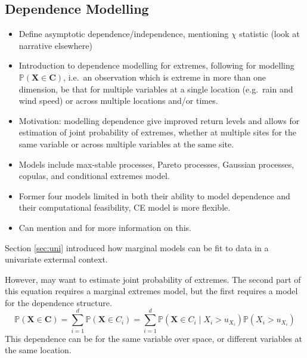 \documentclass{article}
\numberwithin{equation}{section}
\begin{document}
\subsection{Dependence Modelling}
\begin{itemize}
  \item Define asymptotic dependence/independence, mentioning $\chi$ statistic (look at narrative elsewhere)
  \item Introduction to dependence modelling for extremes, following \cite{Heffernan2004} for modelling $\mathbb{P}(\bm{X} \in \bm{C})$, i.e.\ an observation which is extreme in more than one dimension, be that for multiple variables at a single location (e.g.\ rain and wind speed) or across multiple locations and/or times. 
  \item Motivation: modelling dependence give improved return levels and allows for estimation of joint probability of extremes, whether at multiple sites for the same variable or across multiple variables at the same site.
  \item Models include max-stable processes, Pareto processes, Gaussian processes, copulas, and conditional extremes model.
  \item Former four models limited in both their ability to model dependence and their computational feasibility, CE model is more flexible.
  \item Can mention \cite{Tawn2018} and \cite{Huser2024} for more information on this.
\end{itemize}

Section \ref{sec:uni} introduced how marginal models can be fit to data in a univariate extermal context.

However, may want to estimate joint probability of extremes.
The second part of this equation requires a marginal extremes model, but the first requires a model for the dependence structure. 
\begin{equation} \label{eq:joint_prob}
  \mathbb{P}(\bm{X} \in \bm{C}) = \sum_{i=1}^{d}{\mathbb{P}\left(\bm{X} \in C_i\right)} = 
  \sum_{i=1}^{d}{\mathbb{P}\left(\bm{X} \in C_i \mid X_i > u_{X_i}\right) \mathbb{P}\left(X_i > u_{X_i}\right)}
\end{equation}
This dependence can be for the same variable over space, or different variables at the same location.
\end{document}
